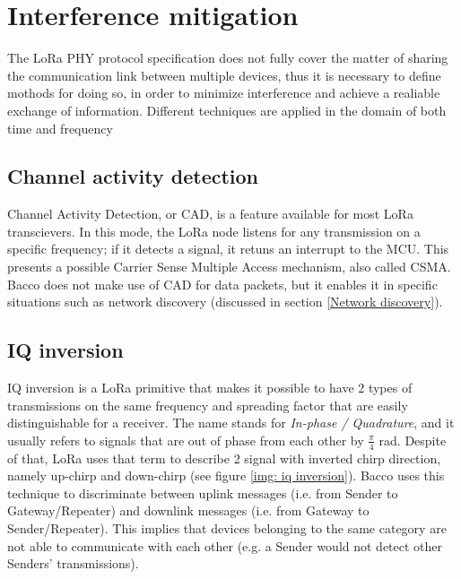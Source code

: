 \section{Interference mitigation}
The LoRa PHY protocol specification does not fully cover the matter of sharing the communication link between multiple
devices, thus it is necessary to define mothods for doing so, in order to minimize interference and achieve
a realiable exchange of information. Different techniques are applied in the domain of both time and frequency

\subsection{Channel activity detection}
Channel Activity Detection, or CAD, is a feature available for most LoRa transcievers\cite{cad}. In this mode, the LoRa node
listens for any transmission on a specific frequency; if it detects a signal, it retuns an interrupt to the MCU. This
presents a possible Carrier Sense Multiple Access mechanism, also called CSMA.\\
Bacco does not make use of CAD for data packets, but it enables it in specific situations such as network discovery (discussed
in section \ref{Network discovery}).

\subsection{IQ inversion}
IQ inversion is a LoRa primitive that makes it possible to have 2 types of transmissions on the same frequency and
spreading factor that are easily
distinguishable for a receiver. The name stands for \emph{In-phase / Quadrature}, and it usually refers to
signals that are out of phase from each other by $\frac{\pi}{4}$ rad. Despite of that, LoRa uses that term to describe
2 signal with inverted chirp direction, namely up-chirp and down-chirp (see figure \ref{img: iq inversion}). Bacco uses this technique to discriminate between uplink messages (i.e. from Sender to
Gateway/Repeater) and downlink messages (i.e. from Gateway to Sender/Repeater). This implies that devices belonging to
the same category are not able to communicate with each other (e.g. a Sender would not detect other Senders' transmissions).

